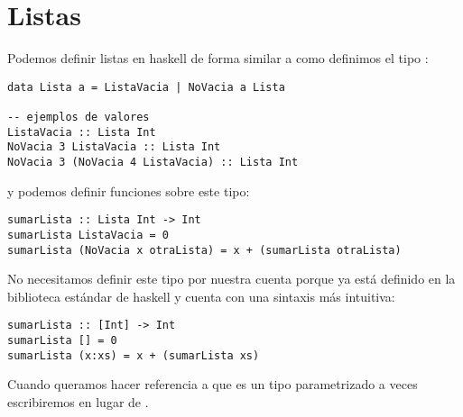 \section{Listas}
Podemos definir listas en haskell de forma similar a como
definimos el tipo :
\begin{verbatim}
data Lista a = ListaVacia | NoVacia a Lista

-- ejemplos de valores
ListaVacia :: Lista Int
NoVacia 3 ListaVacia :: Lista Int
NoVacia 3 (NoVacia 4 ListaVacia) :: Lista Int
\end{verbatim}
y podemos definir funciones sobre este tipo:
\begin{verbatim}
sumarLista :: Lista Int -> Int
sumarLista ListaVacia = 0
sumarLista (NoVacia x otraLista) = x + (sumarLista otraLista)
\end{verbatim}
No necesitamos definir este tipo por nuestra cuenta
porque ya está definido en la biblioteca estándar de haskell
y cuenta con una sintaxis más intuitiva:
\begin{verbatim}
sumarLista :: [Int] -> Int
sumarLista [] = 0
sumarLista (x:xs) = x + (sumarLista xs)
\end{verbatim}
Cuando queramos hacer referencia a que \cod{[]} es un tipo
parametrizado a veces escribiremos  en lugar
de \cod{[Int]}.

